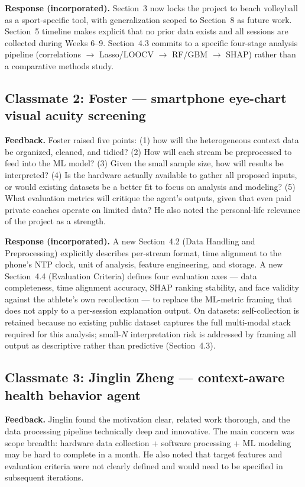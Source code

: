 \documentclass[sigconf,nonacm]{acmart}
\begin{document}
\textbf{Response (incorporated).} Section~3 now locks the project to beach volleyball as a sport-specific tool, with generalization scoped to Section~8 as future work. Section~5 timeline makes explicit that no prior data exists and all sessions are collected during Weeks 6--9. Section~4.3 commits to a specific four-stage analysis pipeline (correlations $\to$ Lasso/LOOCV $\to$ RF/GBM $\to$ SHAP) rather than a comparative methods study.

\subsection*{Classmate 2: Foster --- smartphone eye-chart visual acuity screening}

\textbf{Feedback.} Foster raised five points: (1) how will the heterogeneous context data be organized, cleaned, and tidied? (2) How will each stream be preprocessed to feed into the ML model? (3) Given the small sample size, how will results be interpreted? (4) Is the hardware actually available to gather all proposed inputs, or would existing datasets be a better fit to focus on analysis and modeling? (5) What evaluation metrics will critique the agent's outputs, given that even paid private coaches operate on limited data? He also noted the personal-life relevance of the project as a strength.

\textbf{Response (incorporated).} A new Section~4.2 (Data Handling and Preprocessing) explicitly describes per-stream format, time alignment to the phone's NTP clock, unit of analysis, feature engineering, and storage. A new Section~4.4 (Evaluation Criteria) defines four evaluation axes --- data completeness, time alignment accuracy, SHAP ranking stability, and face validity against the athlete's own recollection --- to replace the ML-metric framing that does not apply to a per-session explanation output. On datasets: self-collection is retained because no existing public dataset captures the full multi-modal stack required for this analysis; small-$N$ interpretation risk is addressed by framing all output as descriptive rather than predictive (Section~4.3).

\subsection*{Classmate 3: Jinglin Zheng --- context-aware health behavior agent}

\textbf{Feedback.} Jinglin found the motivation clear, related work thorough, and the data processing pipeline technically deep and innovative. The main concern was scope breadth: hardware data collection + software processing + ML modeling may be hard to complete in a month. He also noted that target features and evaluation criteria were not clearly defined and would need to be specified in subsequent iterations.
\end{document}
